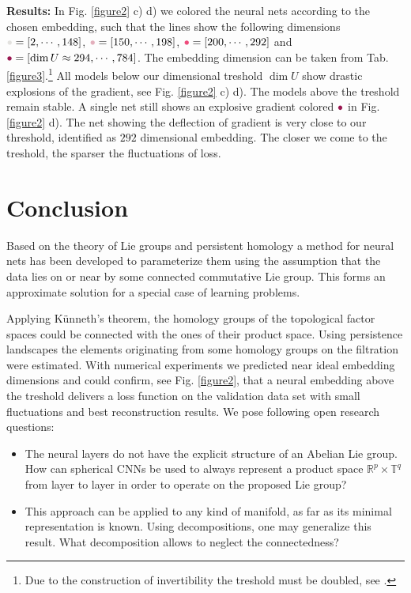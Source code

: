 \documentclass[runningheads,orivec]{llncs}
\begin{document}
\textbf{Results:} In Fig. \ref{figure2} c) d) we colored the neural nets according to the chosen embedding, such that the lines show the following dimensions ${\color{red1}\bullet} = [2, \cdots, 148]$, ${\color{red2}\bullet} = [150, \cdots, 198]$, ${\color{red3}\bullet} = [200, \cdots, 292]$ and ${\color{red4}\bullet} = [\dim U \approx 294, \cdots, 784]$.  The embedding dimension can be taken from Tab. \ref{figure3}.\footnote{Due to the construction of invertibility the treshold must be doubled, see \cite{DinhSB17}.} All models below our dimensional treshold $\dim U$ show drastic explosions of the gradient, see Fig. \ref{figure2} c) d). The models above the treshold remain stable. A single net still shows an explosive gradient colored ${\color{red4}\bullet}$ in Fig. \ref{figure2} d). The net showing the deflection of gradient is very close to our threshold, identified as $292$ dimensional embedding. The closer we come to the treshold, the sparser the fluctuations of loss.


\section{Conclusion}
Based on the theory of Lie groups and persistent homology a method for neural nets has been developed to parameterize them using the assumption that the data lies on or near by some connected commutative Lie group. This forms an approximate solution for a special case of learning problems. 

Applying Künneth's theorem, the homology groups of the topological factor spaces could be connected with the ones of their product space. Using persistence landscapes the elements originating from some homology groups on the filtration were estimated. With numerical experiments we predicted near ideal embedding dimensions and could confirm, see Fig. \ref{figure2}, that a neural embedding above the treshold delivers a loss function on the validation data set with small fluctuations and best reconstruction results. We pose following open research questions:
\begin{itemize}
    \item The neural layers do not have the explicit structure of an Abelian Lie group. How can spherical CNNs \cite{CohenGKW18} be used to always represent a product space $\mathbb{R}^p \times \mathbb{T}^q$ from layer to layer in order to operate on the proposed Lie group?
    \item This approach can be applied to any kind of manifold, as far as its minimal representation is known. Using decompositions, one may generalize this result. What decomposition allows to neglect the connectedness?
\end{itemize}



\end{document}
